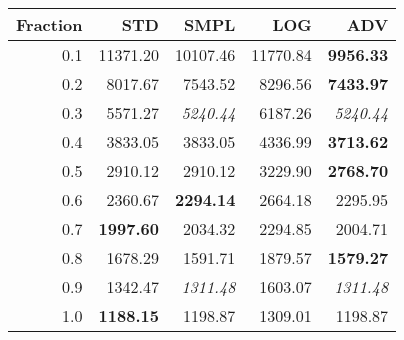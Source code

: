 \documentclass{standalone}
\begin{document}
\begin{tabular}{r|rrrr}
      \toprule
      Fraction & STD & SMPL & LOG & ADV\\
      \midrule
      0.1 & 11371.20 & 10107.46 & 11770.84 & \textbf{9956.33}\\
  0.2 & 8017.67 & 7543.52 & 8296.56 & \textbf{7433.97}\\
  0.3 & 5571.27 & \emph{5240.44} & 6187.26 & \emph{5240.44}\\
  0.4 & 3833.05 & 3833.05 & 4336.99 & \textbf{3713.62}\\
  0.5 & 2910.12 & 2910.12 & 3229.90 & \textbf{2768.70}\\
  0.6 & 2360.67 & \textbf{2294.14} & 2664.18 & 2295.95\\
  0.7 & \textbf{1997.60} & 2034.32 & 2294.85 & 2004.71\\
  0.8 & 1678.29 & 1591.71 & 1879.57 & \textbf{1579.27}\\
  0.9 & 1342.47 & \emph{1311.48} & 1603.07 & \emph{1311.48}\\
  1.0 & \textbf{1188.15} & 1198.87 & 1309.01 & 1198.87\\
  \bottomrule
\end{tabular}
\end{document}
